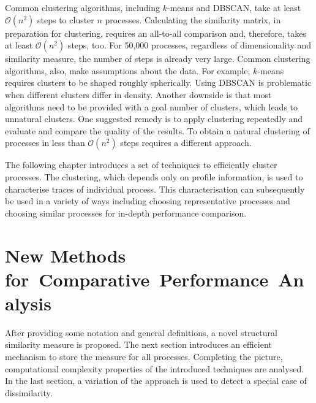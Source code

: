 \documentclass[a4paper, final, diplominf]{zih-template}
\begin{document}
Common clustering algorithms, including $k$-means and DBSCAN, take at least $\mathcal{O}(n^2)$ steps to cluster $n$ processes.
Calculating the similarity matrix, in preparation for clustering, requires an all-to-all comparison and, therefore, takes at least $\mathcal{O}(n^2)$ steps, too.
For 50,000 processes, regardless of dimensionality and similarity measure, the number of steps is already very large.
Common clustering algorithms, also, make assumptions about the data.
For example, $k$-means requires clusters to be shaped roughly spherically.
Using DBSCAN is problematic when different clusters differ in density.
Another downside is that most algorithms need to be provided with a goal number of clusters, which leads to unnatural clusters.
One suggested remedy is to apply clustering repeatedly and evaluate and compare the quality of the results.
To obtain a natural clustering of processes in less than $\mathcal{O}(n^2)$ steps requires a different approach.

The following chapter introduces a set of techniques to efficiently cluster processes.
The clustering, which depends only on profile information, is used to characterise traces of individual process.
This characterisation can subsequently be used in a variety of ways including choosing representative processes and choosing similar processes for in-depth performance comparison.

\chapter{New Methods for~Comparative~Performance~Analysis}
\label{sec:new}
After providing some notation and general definitions, a novel structural similarity measure is proposed.
The next section introduces an efficient mechanism to store the measure for all processes.
Completing the picture, computational complexity properties of the introduced techniques are analysed.
In the last section, a variation of the approach is used to detect a special case of dissimilarity.

\end{document}
